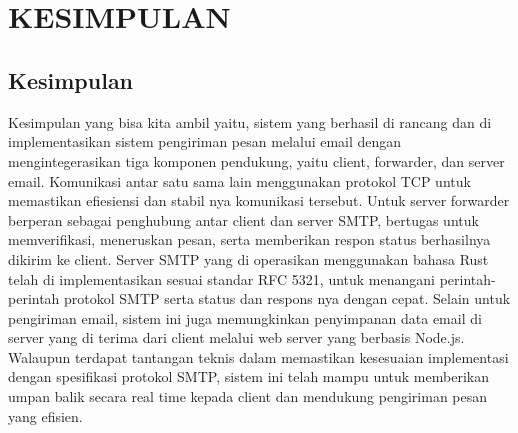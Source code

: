 \documentclass[12pt, a4paper]{article}
\begin{document}
\pagebreak
\section{\centering\\ KESIMPULAN}
\subsection{Kesimpulan}
\begin{adjustwidth}{1.4cm}{0cm}
\quad\quad Kesimpulan yang bisa kita ambil yaitu, sistem yang berhasil di rancang dan di implementasikan sistem pengiriman pesan melalui email dengan mengintegerasikan tiga komponen pendukung, yaitu client, forwarder, dan server email. Komunikasi antar satu sama lain menggunakan protokol TCP untuk memastikan efiesiensi dan stabil nya komunikasi tersebut. 
Untuk server forwarder berperan sebagai penghubung antar client dan server SMTP, bertugas untuk memverifikasi,  meneruskan pesan, serta memberikan respon status berhasilnya dikirim ke client. Server SMTP yang di operasikan menggunakan bahasa Rust telah di implementasikan sesuai standar RFC 5321, untuk menangani perintah-perintah protokol SMTP serta status dan respons nya dengan cepat.
Selain untuk pengiriman email, sistem ini juga memungkinkan penyimpanan data email di server yang di terima dari client melalui web server yang  berbasis Node.js. Walaupun terdapat tantangan teknis dalam memastikan kesesuaian implementasi dengan spesifikasi protokol SMTP, sistem ini telah mampu untuk memberikan umpan balik secara real time kepada client dan mendukung pengiriman pesan yang efisien.
\end{adjustwidth}
\end{document}
